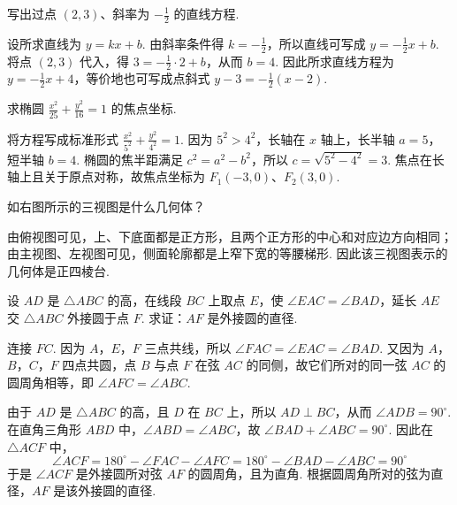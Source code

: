 \begin{problem}
写出过点 \((2,3)\)、斜率为 \(-\frac{1}{2}\) 的直线方程.
\end{problem}

\begin{solution}
设所求直线为 \(y=kx+b\). 由斜率条件得 \(k=-\frac12\)，所以直线可写成 \(y=-\frac12x+b\). 将点 \((2,3)\) 代入，得 \(3=-\frac12\cdot2+b\)，从而 \(b=4\). 因此所求直线方程为 \(y=-\frac12x+4\)，等价地也可写成点斜式 \(y-3=-\frac12\left( x-2 \right)\).
\end{solution}

\begin{problem}
求椭圆 \(\frac{x^2}{25}+\frac{y^2}{16}=1\) 的焦点坐标.
\end{problem}

\begin{solution}
将方程写成标准形式
\(\frac{x^2}{5^2}+\frac{y^2}{4^2}=1\). 因为 \(5^2>4^2\)，长轴在 \(x\) 轴上，长半轴 \(a=5\)，短半轴 \(b=4\). 椭圆的焦半距满足 \(c^2=a^2-b^2\)，所以 \(c=\sqrt{5^2-4^2}=3\). 焦点在长轴上且关于原点对称，故焦点坐标为 \(F_1\left(-3,0\right)\)、\(F_2\left(3,0\right)\).
\end{solution}

\begin{problem}
如右图所示的三视图是什么几何体？

\end{problem}

\begin{solution}
由俯视图可见，上、下底面都是正方形，且两个正方形的中心和对应边方向相同；由主视图、左视图可见，侧面轮廓都是上窄下宽的等腰梯形. 因此该三视图表示的几何体是正四棱台.
\end{solution}

\begin{problem}
设 \(AD\) 是 \(\triangle ABC\) 的高，在线段 \(BC\) 上取点 \(E\)，使 \(\angle EAC=\angle BAD\)，延长 \(AE\) 交 \(\triangle ABC\) 外接圆于点 \(F\). 求证：\(AF\) 是外接圆的直径.

\end{problem}

\begin{solution}
连接 \(FC\). 因为 \(A\)，\(E\)，\(F\) 三点共线，所以 \(\angle FAC=\angle EAC=\angle BAD\). 又因为 \(A\)，\(B\)，\(C\)，\(F\) 四点共圆，点 \(B\) 与点 \(F\) 在弦 \(AC\) 的同侧，故它们所对的同一弦 \(AC\) 的圆周角相等，即 \(\angle AFC=\angle ABC\).

由于 \(AD\) 是 \(\triangle ABC\) 的高，且 \(D\) 在 \(BC\) 上，所以 \(AD\perp BC\)，从而 \(\angle ADB=90^\circ\). 在直角三角形 \(ABD\) 中，\(\angle ABD=\angle ABC\)，故 \(\angle BAD+\angle ABC=90^\circ\). 因此在 \(\triangle ACF\) 中，
\[
\angle ACF=180^\circ-\angle FAC-\angle AFC=180^\circ-\angle BAD-\angle ABC=90^\circ
\]
于是 \(\angle ACF\) 是外接圆所对弦 \(AF\) 的圆周角，且为直角. 根据圆周角所对的弦为直径，\(AF\) 是该外接圆的直径.
\end{solution}

